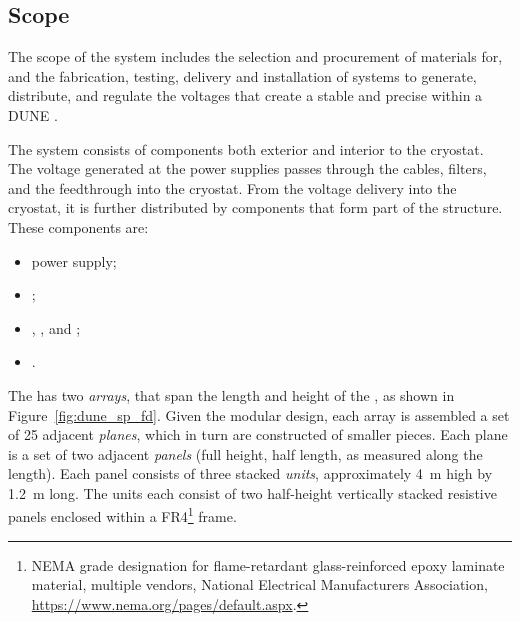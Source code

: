 \subsection{Scope}
\label{sec:fdsp-hv-scope}

The scope of the  system includes the selection and procurement of materials for, and the fabrication, testing, delivery and installation of systems to generate, distribute, and regulate the voltages that
create a stable and precise \efield{} within a DUNE . %

The  system consists of components both exterior and interior to the cryostat. The voltage generated at the  power supplies passes through the cables, filters, and the  feedthrough into the cryostat. From the voltage delivery into the cryostat, it is further distributed by components that form part of the  structure. 
These components are:
\begin{itemize}
\item {} power supply;
\item {};
\item {}, , and ;
\item {}.
\end{itemize}


The  has two  \textit{arrays}, that span the length and height of the , as shown in Figure~\ref{fig:dune_sp_fd}. Given the modular design, each array is assembled a set of 25 adjacent  \textit{planes}, which in turn are constructed of smaller pieces.  Each plane is a set of two adjacent \textit{panels} (full height, half length, as measured along the  length). Each panel consists of three stacked \textit{units}, approximately \SI{4}{\m} high by \SI{1.2}{\meter} long. The units each consist of two half-height vertically stacked resistive panels enclosed within a FR4\footnote{NEMA grade designation for flame-retardant glass-reinforced epoxy laminate material, multiple vendors, National Electrical Manufacturers Association\texttrademark{},  \url{https://www.nema.org/pages/default.aspx}.} frame.

